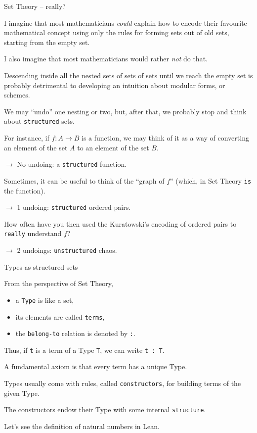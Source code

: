 \documentclass{beamer}
\begin{document}
\begin{frame}[fragile]{Set Theory -- really?}

I imagine that most mathematicians {\emph{could}} explain how to encode their favourite mathematical concept using only the rules for forming sets out of old sets, starting from the empty set.
\bigskip

I also imagine that most mathematicians would rather {\emph{not}} do that.
\bigskip

Descending inside all the nested sets of sets of sets until we reach the empty set is probably detrimental to developing an intuition about modular forms, or schemes.
\end{frame}

\begin{frame}[fragile]

We may ``undo'' one nesting or two, but, after that, we probably stop and think about {\color{violet}\verb`structured`} sets.
\bigskip

For instance, if $f \colon A \longrightarrow B$ is a function, we may think of it as a way of converting an element of the set $A$ to an element of the set $B$.

$\to$ No undoing: a {\color{violet}\verb`structured`} function.
\bigskip

Sometimes, it can be useful to think of the ``graph of $f$'' (which, in Set Theory {\color{violet}\verb`is`} the function).

$\to$ 1 undoing: {\color{violet}\verb`structured`} ordered pairs.
\bigskip

How often have you then used the Kuratowski's encoding of ordered pairs to {\color{violet}\verb`really`} understand $f$?

$\to$ 2 undoings: {\color{violet}\verb`unstructured`} chaos.
\end{frame}

\begin{frame}[fragile]{Types as structured sets}

From the perspective of Set Theory,
\begin{itemize}
\item
  a {\color{violet}\verb`Type`} is like a set,
\item
  its elements are called {\color{violet}\verb`terms`},
\item
  the {\color{violet}\verb`belong-to`} relation is denoted by {\color{violet}\verb`:`}.
\end{itemize}
\bigskip

Thus, if {\color{violet}\verb`t`} is a term of a Type {\color{violet}\verb`T`}, we can write {\color{violet}\verb`t : T`}.
\bigskip

A fundamental axiom is that every term has a unique Type.
\bigskip

Types usually come with rules, called {\color{violet}\verb`constructors`}, for building terms of the given Type.
\bigskip

The constructors endow their Type with some internal {\color{violet}\verb`structure`}.
\bigskip

Let's see the definition of natural numbers in Lean.
\end{frame}
\end{document}
